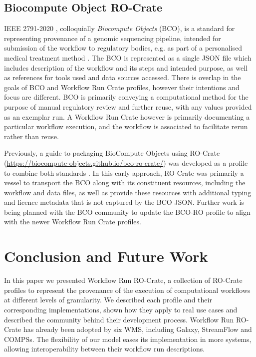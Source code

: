 \documentclass[10pt,letterpaper]{article}
\begin{document}
\subsection{Biocompute Object RO-Crate}\label{bco-crate}
IEEE 2791-2020 \cite{Mazumder 2020}, colloquially \emph{Biocompute Objects} (BCO), is a standard for representing provenance of a genomic sequencing pipeline, intended for submission of the workflow to regulatory bodies, e.g. as part of a personalised medical treatment method \cite{Alterovitz 2018}. 
The BCO is represented as a single JSON file which includes description of the workflow and its steps and intended purpose, as well as references for tools used and data sources accessed. 
There is overlap in the goals of BCO and Workflow Run Crate profiles, however their intentions and focus are different. 
BCO is primarily conveying a computational method for the purpose of manual regulatory review and further reuse, with any values provided as an exemplar run.  
A Workflow Run Crate however is primarily documenting a particular workflow execution, and the workflow is associated to facilitate rerun rather than reuse. 

Previously, a guide to packaging BioCompute Objects using RO-Crate (\url{https://biocompute-objects.github.io/bco-ro-crate/}) was developed as a profile to combine both standards \cite{Soiland-Reyes 2021}.
In this early approach, RO-Crate was primarily a vessel to transport the BCO along with its constituent resources, including the workflow and data files, as well as provide these resources with additional typing and licence metadata that is not captured by the BCO JSON. 
Further work is being planned with the BCO community to update the BCO-RO profile to align with the newer Workflow Run Crate profiles. 

\hypertarget{conclusion}{%
\section{Conclusion and Future Work}\label{conclusion}}

In this paper we presented Workflow Run RO-Crate, a collection of RO-Crate profiles to represent the provenance of the execution of computational workflows at different levels of granularity.
We described each profile and their corresponding implementations, shown how they apply to real use cases and described the community behind their development process.
Workflow Run RO-Crate has already been adopted by six WMS, including Galaxy, StreamFlow and COMPSs. The flexibility of our model eases its implementation in more systems, allowing interoperability between their workflow run descriptions.
\end{document}

